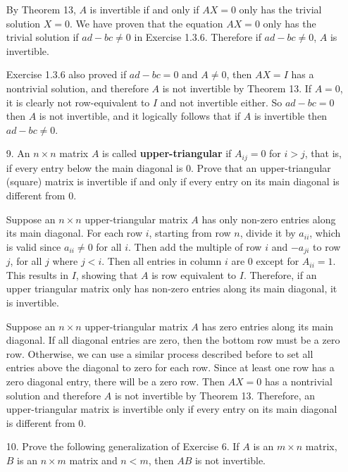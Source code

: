 \documentclass{article}
\begin{document}
\begin{enumerate}[listparindent=\parindent]
By Theorem 13, \(A\) is invertible if and only if \(AX = 0\) only has the trivial solution \(X = 0\).
We have proven that the equation \(AX = 0\) only has the trivial solution if \(ad - bc \neq 0\) in Exercise 1.3.6.
Therefore if \(ad - bc \neq 0\), \(A\) is invertible.

Exercise 1.3.6 also proved if \(ad - bc = 0\) and \(A \neq 0\), then \(AX = I\) has a nontrivial solution,
and therefore \(A\) is not invertible by Theorem 13. If \(A = 0\), it is clearly not row-equivalent to \(I\) and not invertible either.
So \(ad - bc = 0\) then \(A\) is not invertible, and it logically follows that if \(A\) is invertible then \(ad - bc \neq 0\).

\item[9.] An \(n \times n\) matrix \(A\) is called \textbf{upper-triangular} if \(A_{ij} = 0\) for \(i > j\),
    that is, if every entry below the main diagonal is 0. Prove that an upper-triangular (square) matrix
    is invertible if and only if every entry on its main diagonal is different from 0.

Suppose an \(n \times n\) upper-triangular matrix \(A\) has only non-zero entries along its main diagonal.
For each row \(i\), starting from row \(n\), divide it by \(a_{ii}\), which is valid since \(a_{ii} \neq 0\) for all \(i\).
Then add the multiple of row \(i\) and \(-a_{ji}\) to row \(j\), for all \(j\) where \(j < i\). Then all entries in column \(i\) are 0 except for \(A_{ii} = 1\).
This results in \(I\), showing that \(A\) is row equivalent to \(I\).
Therefore, if an upper triangular matrix only has non-zero entries along its main diagonal, it is invertible.

Suppose an \(n \times n\) upper-triangular matrix \(A\) has zero entries along its main diagonal.
If all diagonal entries are zero, then the bottom row must be a zero row.
Otherwise, we can use a similar process described before to set all entries above the diagonal to zero for each row.
Since at least one row has a zero diagonal entry, there will be a zero row.
Then \(AX = 0\) has a nontrivial solution and therefore \(A\) is not invertible by Theorem 13.
Therefore, an upper-triangular matrix is invertible only if every entry on its main diagonal is different from 0.

\item[10.] Prove the following generalization of Exercise 6. If \(A\) is an \(m \times n\) matrix, \(B\) is an \(n \times m\) matrix
    and \(n < m\), then \(AB\) is not invertible.


\end{enumerate}
\end{document}
